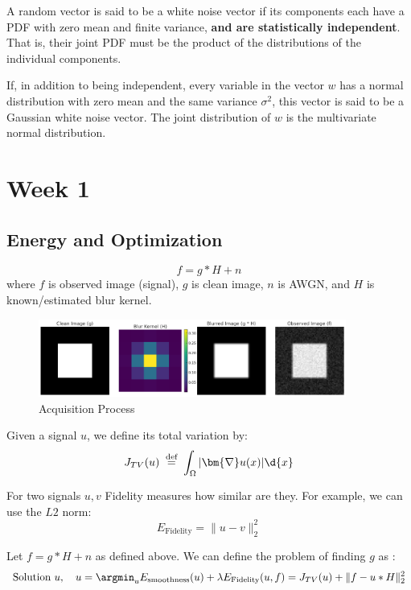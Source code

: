 \documentclass{article}
\begin{document}
\begin{definition}  A random vector is said to be a white noise vector if its components each have a PDF with zero mean and finite variance, \textbf{and are statistically independent}. That is, their joint PDF must be the product of the distributions of the individual components.  

If, in addition to being independent, every variable in the vector $w$ has a normal distribution with zero mean  and the same variance $\sigma ^2$, this vector is said to be a Gaussian white noise vector. The joint distribution of $w$ is the multivariate normal distribution.  
\end{definition}



\section{Week 1}
\subsection{Energy and Optimization}
\begin{definition} 
\begin{equation*}
  \boxed{ f = g \ast H + n}
\end{equation*}
  where $f$ is observed image (signal), $g$ is clean image, $n$ is AWGN, and $H$ is known/estimated blur kernel. 

  \begin{figure}[H] \centering \includegraphics[width=0.9\textwidth,keepaspectratio]{acquisitionProcess.png} \caption{Acquisition Process} \label{fig:acquisitionProcess.png} \end{figure}
\end{definition}

\begin{definition} 
  Given a signal $u$, we define its total variation by:
\[
  J_{TV}(u) \stackrel{\text{ def }}{=}  \int_{\Omega} | \bm{\nabla}  u(x) | \d{x}
\]
\end{definition}

\begin{definition} 
  For two signals $u,v$ Fidelity measures how similar are they. For example, we can use the $L2$ norm:
  \[
    E_{\text{Fidelity}} = \lVert u - v \rVert ^2_2
  \]
  
\end{definition}
\begin{example}
  Let $f = g \ast H + n$ as defined above. We can define the problem of finding $g$ as :
  \[
    \text{Solution } u, \quad   u = \argmin_{u} E_{\text{smoothness}}(u) + \lambda E_{\text{Fidelity}}(u,f) = J_{TV}(u) + \lVert f- u \ast H \rVert_2 ^2
  \]
\end{example}
\end{document}
